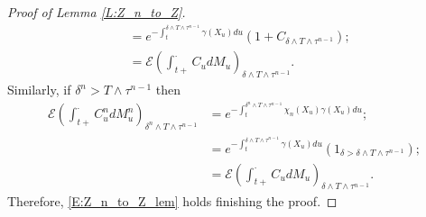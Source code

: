 \documentclass[11pt, letterpaper]{amsart}
\theoremstyle{definition}
\theoremstyle{remark}
\numberwithin{equation}{section}
\newcommand{\EN}{\mathcal{E}}
\begin{document}
\begin{proof}[Proof of Lemma \ref{L:Z_n_to_Z}]
\begin{equation*}
\begin{split}
&=e^{-\int_t^{\delta\wedge T\wedge\tau^{n-1}}\gamma(X_u)du}\left(1+C_{\delta\wedge T\wedge\tau^{n-1}}\right);\\
&= \EN\left(\int_{t+}^\cdot C_u dM_u\right)_{\delta\wedge T\wedge \tau^{n-1}}.
\end{split}
\end{equation*}
Similarly, if $\delta^n > T\wedge\tau^{n-1}$ then
\begin{equation*}
\begin{split}
\EN\left(\int_{t+}^\cdot C^n_u dM^n_u\right)_{\delta^n\wedge T\wedge \tau^{n-1}} & = e^{-\int_t^{\delta^n\wedge T\wedge\tau^{n-1}}\chi_n(X_u)\gamma(X_u)du};\\
&=e^{-\int_t^{\delta\wedge T\wedge\tau^{n-1}}\gamma(X_u)du}\left(1_{\delta > \delta\wedge T\wedge\tau^{n-1}}\right);\\
&= \EN\left(\int_{t+}^\cdot C_u dM_u\right)_{\delta\wedge T\wedge \tau^{n-1}}.
\end{split}
\end{equation*}
Therefore, \eqref{E:Z_n_to_Z_lem} holds finishing the proof.

\end{proof}



%

%
\end{document}
